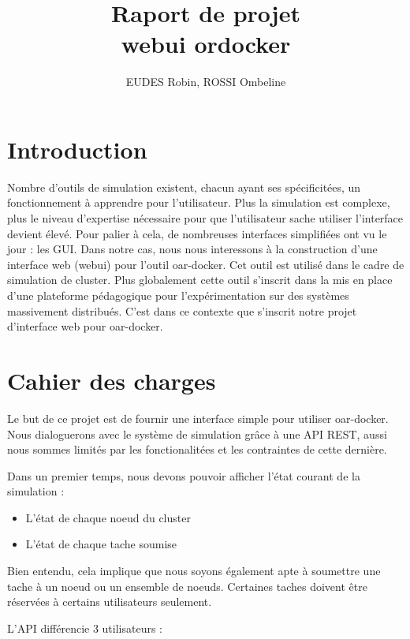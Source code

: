 \documentclass[a4paper,10pt]{article}
\title{Raport de projet \\ webui ordocker}
\author{EUDES Robin, ROSSI Ombeline}
\begin{document}
\maketitle
\tableofcontents
\newpage

\section{Introduction}
Nombre d'outils de simulation existent, chacun ayant ses spécificitées, un fonctionnement à apprendre pour l'utilisateur. Plus la simulation est complexe, plus le niveau d'expertise nécessaire pour que l'utilisateur
sache utiliser l'interface devient élevé. Pour palier à cela, de nombreuses interfaces simplifiées ont vu le jour : les GUI. Dans notre cas, nous nous interessons à la construction d'une interface web (webui)
pour l'outil oar-docker. Cet outil est utilisé dans le cadre de simulation de cluster.
Plus globalement cette outil  s'inscrit dans la mis en place d'une plateforme pédagogique pour l'expérimentation sur des systèmes massivement distribués.
C'est dans ce contexte que s'inscrit notre projet d'interface web pour oar-docker.
\section{Cahier des charges}
Le but de ce projet  est de fournir une interface simple pour utiliser oar-docker. Nous dialoguerons avec le système de simulation grâce à une API REST,
aussi nous sommes limités par les fonctionalitées et les contraintes de cette dernière.
\vspace{0.5cm}

Dans un premier temps, nous devons pouvoir afficher l'état courant de la simulation :

\begin{itemize}
 \item L'état de chaque noeud du cluster
 \item L'état de chaque tache soumise
\end{itemize}
\vspace{0.5cm}

Bien entendu, cela implique que nous soyons également apte à soumettre une tache à un noeud ou un ensemble de noeuds.
Certaines taches doivent être réservées à certains utilisateurs seulement.
\vspace{0.5cm}

L'API  différencie 3 utilisateurs : 
\end{document}
